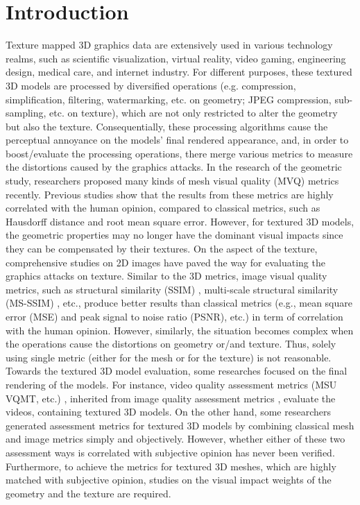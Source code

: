 \section{Introduction}
Texture mapped 3D graphics data are extensively used in various technology realms, such as scientific visualization, virtual reality, video gaming, engineering design, medical care, and internet industry. For different purposes, these textured 3D models are processed by diversified operations (e.g. compression, simplification, filtering, watermarking, etc. on geometry; JPEG compression, sub-sampling, etc. on texture), which are not only restricted to alter the geometry but also the texture. Consequentially, these processing algorithms cause the perceptual annoyance on the models’ final rendered appearance, and, in order to boost/evaluate the processing operations, there merge various metrics to measure the distortions caused by the graphics attacks. In the research of the geometric study, researchers \cite{Lavou__2011}\cite{V_a_2012}\cite{Wang_2011} proposed many kinds of mesh visual quality (MVQ) metrics recently. Previous studies \cite{Corsini_2013}\cite{Guo_2015} show that the results from these metrics are highly correlated with the human opinion, compared to classical metrics, such as Hausdorff distance and root mean square error. However, for textured 3D models, the geometric properties may no longer have the dominant visual impacts since they can be compensated by their textures.  On the aspect of the texture, comprehensive studies on 2D images have paved the way for evaluating the graphics attacks on texture.  Similar to the 3D metrics, image visual quality metrics, such as structural similarity (SSIM) \cite{Wang_2004}, multi-scale structural similarity (MS-SSIM) \cite{Zhou_Wang_2011}, etc., produce better results than classical metrics (e.g., mean square error (MSE) and peak signal to noise ratio (PSNR), etc.) in term of correlation with the human opinion. However, similarly, the situation becomes complex when the operations cause the distortions on geometry or/and texture. Thus, solely using single metric (either for the mesh or for the texture) is not reasonable. Towards the textured 3D model evaluation, some researches focused on the final rendering of the models. For instance, video quality assessment metrics (MSU VQMT, etc.)  \cite{Seshadrinathan_2010}, inherited from image quality assessment metrics \cite{Wang_2006}, evaluate the videos, containing textured 3D models.  On the other hand, some researchers \cite{Tian_2004} generated assessment metrics for textured 3D models by combining classical mesh and image metrics simply and objectively. However, whether either of these two assessment ways is correlated with subjective opinion has never been verified. Furthermore, to achieve the metrics for textured 3D meshes, which are highly matched with subjective opinion, studies on the visual impact weights of the geometry and the texture are required.\\
